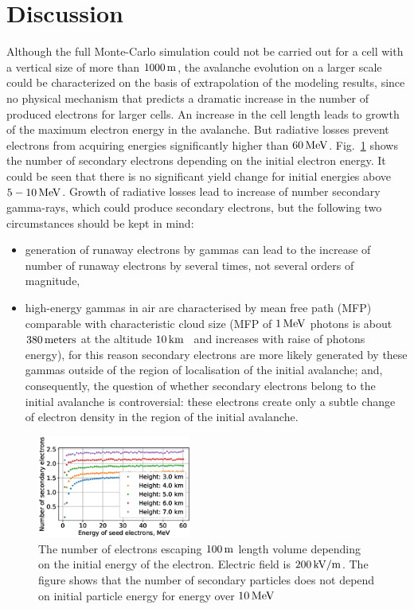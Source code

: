 \documentclass[doublecol,linenumbers]{epl2} %
\begin{document}
    \section{Discussion}
    Although the full Monte-Carlo simulation could not be carried out for a cell with a vertical size of more than $1000\un{m}$, the avalanche evolution on a larger scale could be characterized on the basis of extrapolation of the modeling results, since no physical mechanism that predicts a dramatic increase in the number of produced electrons for larger cells. 
    An increase in the cell length leads to growth of the maximum electron energy in the avalanche. But radiative losses prevent electrons from acquiring energies significantly higher than $60\un{MeV}$. Fig.~\ref{fig:sec} shows the number of secondary electrons depending on the initial electron energy. It could be seen that there is no significant yield change for initial energies above $5-10\un{MeV}$. Growth of radiative losses lead to increase of number secondary gamma-rays, which could produce secondary electrons, but the following two circumstances should be kept in mind:
    \begin{itemize}
        \item generation of runaway electrons by gammas can lead to the increase of number of runaway electrons by several times, not several orders of magnitude,
        \item high-energy gammas in air are characterised by mean free path (MFP) comparable with characteristic cloud size (MFP of $1\un{MeV}$ photons is about $380\un{meters}$ at the altitude $10\un{km}$~\cite{xcom} and increases with raise of photons energy), for this reason secondary electrons are more likely generated by these gammas outside of the region of localisation of the initial avalanche; and, consequently, the question of whether secondary electrons belong to the initial avalanche is controversial: these electrons create only a subtle change of electron density in the region of the initial avalanche.
    \end{itemize}
    \begin{figure}[h]
        \centering
        \includegraphics[width=0.45\textwidth]{figures/secondary.eps}
        \caption{The number of electrons escaping $100~\un{m}$ length volume depending on the initial energy of the electron. Electric field is $200\un{kV/m}$. The figure shows that the number of secondary particles does not depend on initial particle energy for energy over $10\un{MeV}$}
        \label{fig:sec}
    \end{figure} 
    
\end{document}
